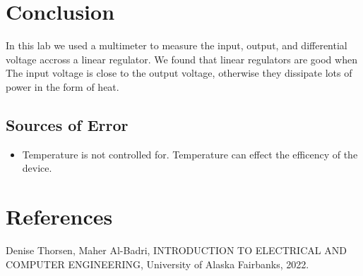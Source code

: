 \documentclass{article}
\begin{document}
\newpage
\section{Conclusion}
In this lab we used a multimeter to measure the input, output, and differential voltage accross a linear regulator. We found that linear regulators are good when The input voltage is close to the output voltage, otherwise they dissipate lots of power in the form of heat.

\subsection{Sources of Error}

\begin{itemize}
	\item Temperature is not controlled for. Temperature can effect the efficency of the device.
\end{itemize}


\newpage
\section{References}
\noindent
[1] Denise Thorsen, Maher Al-Badri, INTRODUCTION TO ELECTRICAL AND COMPUTER ENGINEERING, University of Alaska Fairbanks, 2022.
\newline
\newline
\noindent
\end{document}

